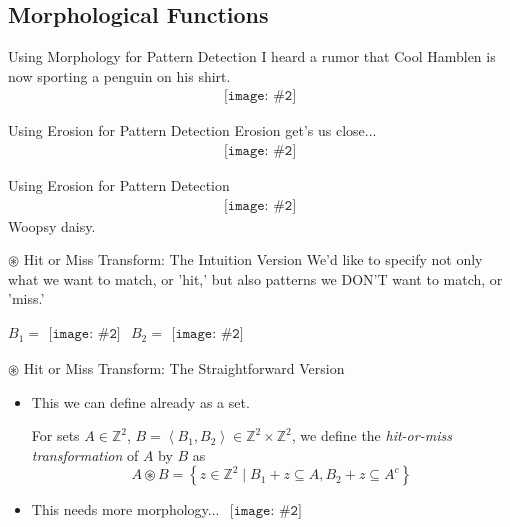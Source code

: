 \documentclass{beamer}
\newcommand{\pic}[2]{
     \begin{array}{l}
      \texttt{[image: \#2]}
      \end{array}
}
\newcommand{\set}[1]{\left\lbrace #1 \right\rbrace}
\newcommand{\buildset}[2]{\set{#1 \mid #2}}
\newcommand{\tuple}[1]{\left\langle #1 \right\rangle}
\newcommand{\hitmiss}{\circledast}
\begin{document}
\subsection{Morphological Functions}

\begin{frame}{Using Morphology for Pattern Detection}
  I heard a rumor that Cool Hamblen is now sporting a penguin on his
  shirt. 
  $$\pic{width=100pt}{images/tux_coolhamblen.png}$$
\end{frame}

\begin{frame}{Using Erosion for Pattern Detection}
  Erosion get's us close...
  $$\pic{width=100pt}{images/tux_coolhamblenhit1.png}$$
\end{frame}

\begin{frame}{Using Erosion for Pattern Detection}
$$\pic{width=100pt}{images/tux_coolhamblenhit2.png}$$
Woopsy daisy.
\end{frame}

\begin{frame}{$\hitmiss$ Hit or Miss Transform: The Intuition Version}
  We'd like to specify not only what we want to match, or 'hit,' 
  but also patterns we DON'T want to match, or 'miss.'

  $B_1 = \pic{width=100pt}{images/binarytux.png}$ 
  $B_2 = \pic{width=100pt}{images/binarytuxmiss.png}$
\end{frame}


\begin{frame}{$\hitmiss$ Hit or Miss Transform: The Straightforward Version}

  \begin{itemize}
    \item This we can define already as a set.
          \begin{definition}
          For sets $A \in \mathbb{Z}^2$,
                   $B = \tuple{B_1,B_2} \in \mathbb{Z}^2 \times \mathbb{Z}^2$,
          we define the \emph{hit-or-miss transformation} of 
          $A$ by $B$ as
          $$A \hitmiss B = \buildset{z \in \mathbb{Z}^2}
                                    {B_1+z \subseteq A,
                                     B_2+z \subseteq A^c}$$
          \end{definition}
    \item This needs more morphology... $\pic{width=75pt}{images/Walken-Cowbell.jpg}$
  \end{itemize}
\end{frame}
\end{document}
